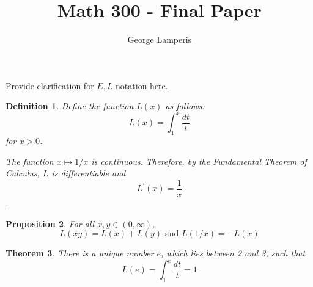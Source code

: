 \documentclass[12pt]{article}
\title{Math 300 - Final Paper}
\author{George Lamperis}
\date{}
\theoremstyle{mystyle}
\newtheorem{thm}{Theorem}
\newtheorem{defn}[thm]{Definition}
\newtheorem{prop}[thm]{Proposition}
\begin{document}
\maketitle

% 
% 
% 
% 
% 
% 
% 
% 
% 
% 

Provide clarification for $E,L$ notation here.

\begin{defn}
  Define the function $L(x)$ as follows:
  $$ L(x) = \int_1^x \frac{dt}{t} $$
  for $x > 0$.
  
  The function $x \mapsto 1/x$ is continuous. Therefore, by the Fundamental
  Theorem of Calculus, $L$ is differentiable and
  $$ L^\prime(x) = \frac{1}{x} $$.
\end{defn}


\begin{prop}
  For all $x,y \in (0, \infty)$,
  $$ L(xy) = L(x) + L(y) \text{ and } L(1/x) = -L(x)$$
\end{prop}


\begin{thm}
  There is a unique number $e$, which lies between 2 and 3, such that 
  $$ L(e) = \int_1^e \frac{dt}{t} = 1 $$
\end{thm}
\end{document}
